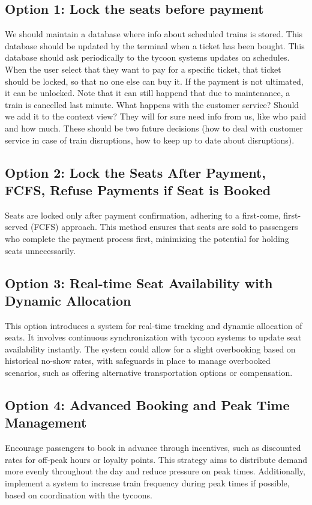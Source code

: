 \subsection*{Option 1: Lock the seats before payment}
We should maintain a database where info about scheduled trains is stored. 
This database should be updated by the terminal when a ticket has been bought.
This database should ask periodically to the tycoon systems updates on schedules.
When the user select that they want to pay for a specific ticket, that ticket should be locked, so that no one else can buy it. 
If the payment is not ultimated, it can be unlocked.
Note that it can still happend that due to maintenance, a train is cancelled last minute. 
What happens with the customer service? Should we add it to the context view? They will for sure need info from us, like who paid and how much. 
These should be two future decisions (how to deal with customer service in case of train disruptions, how to keep up to date about disruptions).

\subsection*{Option 2: Lock the Seats After Payment, FCFS, Refuse Payments if Seat is Booked}
Seats are locked only after payment confirmation, adhering to a first-come, first-served (FCFS) approach. This method ensures that seats are sold to passengers who complete the payment process first, minimizing the potential for holding seats unnecessarily.

\subsection*{Option 3: Real-time Seat Availability with Dynamic Allocation}
This option introduces a system for real-time tracking and dynamic allocation of seats. It involves continuous synchronization with tycoon systems to update seat availability instantly. The system could allow for a slight overbooking based on historical no-show rates, with safeguards in place to manage overbooked scenarios, such as offering alternative transportation options or compensation.

\subsection*{Option 4: Advanced Booking and Peak Time Management}
Encourage passengers to book in advance through incentives, such as discounted rates for off-peak hours or loyalty points. This strategy aims to distribute demand more evenly throughout the day and reduce pressure on peak times. Additionally, implement a system to increase train frequency during peak times if possible, based on coordination with the tycoons.

